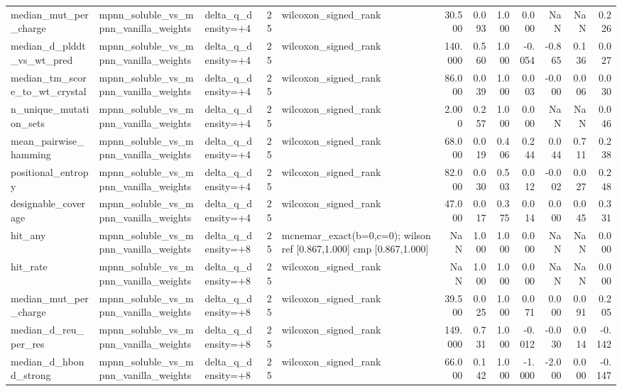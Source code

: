 \begin{table}
{\begin{tabular}{lllrlrrrrrrr}
median\_mut\_per\_charge & mpnn\_soluble\_vs\_mpnn\_vanilla\_weights & delta\_q\_density=+4 & 25 & wilcoxon\_signed\_rank & 30.500 & 0.093 & 1.000 & 0.000 & NaN & NaN & 0.226 \\
median\_d\_plddt\_vs\_wt\_pred & mpnn\_soluble\_vs\_mpnn\_vanilla\_weights & delta\_q\_density=+4 & 25 & wilcoxon\_signed\_rank & 140.000 & 0.560 & 1.000 & -0.054 & -0.865 & 0.136 & 0.027 \\
median\_tm\_score\_to\_wt\_crystal & mpnn\_soluble\_vs\_mpnn\_vanilla\_weights & delta\_q\_density=+4 & 25 & wilcoxon\_signed\_rank & 86.000 & 0.039 & 1.000 & 0.003 & -0.000 & 0.006 & 0.030 \\
n\_unique\_mutation\_sets & mpnn\_soluble\_vs\_mpnn\_vanilla\_weights & delta\_q\_density=+4 & 25 & wilcoxon\_signed\_rank & 2.000 & 0.257 & 1.000 & 0.000 & NaN & NaN & 0.046 \\
mean\_pairwise\_hamming & mpnn\_soluble\_vs\_mpnn\_vanilla\_weights & delta\_q\_density=+4 & 25 & wilcoxon\_signed\_rank & 68.000 & 0.019 & 0.406 & 0.244 & 0.044 & 0.711 & 0.238 \\
positional\_entropy & mpnn\_soluble\_vs\_mpnn\_vanilla\_weights & delta\_q\_density=+4 & 25 & wilcoxon\_signed\_rank & 82.000 & 0.030 & 0.503 & 0.012 & -0.002 & 0.027 & 0.248 \\
designable\_coverage & mpnn\_soluble\_vs\_mpnn\_vanilla\_weights & delta\_q\_density=+4 & 25 & wilcoxon\_signed\_rank & 47.000 & 0.017 & 0.375 & 0.014 & 0.000 & 0.045 & 0.331 \\
hit\_any & mpnn\_soluble\_vs\_mpnn\_vanilla\_weights & delta\_q\_density=+8 & 25 & mcnemar\_exact(b=0,c=0); wilson ref [0.867,1.000] cmp [0.867,1.000] & NaN & 1.000 & 1.000 & 0.000 & NaN & NaN & 0.000 \\
hit\_rate & mpnn\_soluble\_vs\_mpnn\_vanilla\_weights & delta\_q\_density=+8 & 25 & wilcoxon\_signed\_rank & NaN & 1.000 & 1.000 & 0.000 & NaN & NaN & 0.000 \\
median\_mut\_per\_charge & mpnn\_soluble\_vs\_mpnn\_vanilla\_weights & delta\_q\_density=+8 & 25 & wilcoxon\_signed\_rank & 39.500 & 0.025 & 1.000 & 0.071 & 0.000 & 0.091 & 0.205 \\
median\_d\_reu\_per\_res & mpnn\_soluble\_vs\_mpnn\_vanilla\_weights & delta\_q\_density=+8 & 25 & wilcoxon\_signed\_rank & 149.000 & 0.731 & 1.000 & -0.012 & -0.030 & 0.014 & -0.142 \\
median\_d\_hbond\_strong & mpnn\_soluble\_vs\_mpnn\_vanilla\_weights & delta\_q\_density=+8 & 25 & wilcoxon\_signed\_rank & 66.000 & 0.142 & 1.000 & -1.000 & -2.000 & 0.000 & -0.147 \\

\end{tabular}}
\end{table}
